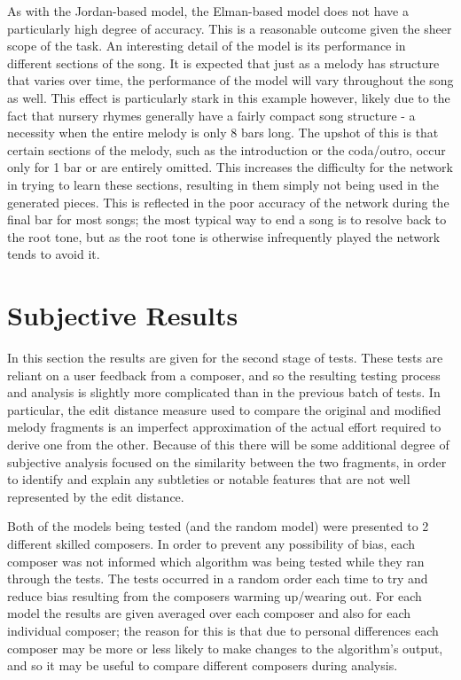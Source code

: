 \documentclass[ author={Stephen Livermore-Tozer},
				supervisor={Dr. Peter Flach},
				degree={MEng},
				title={Algorithmic Co-composition Using Machine Learning},
				subtitle={},
				type={research},
				year={2016} ]{dissertation}
\begin{document}
	
	As with the Jordan-based model, the Elman-based model does not have a particularly high degree of accuracy. This is a reasonable outcome given the sheer scope of the task. An interesting detail of the model is its performance in different sections of the song. It is expected that just as a melody has structure that varies over time, the performance of the model will vary throughout the song as well. This effect is particularly stark in this example however, likely due to the fact that nursery rhymes generally have a fairly compact song structure - a necessity when the entire melody is only 8 bars long. The upshot of this is that certain sections of the melody, such as the introduction or the coda/outro, occur only for 1 bar or are entirely omitted. This increases the difficulty for the network in trying to learn these sections, resulting in them simply not being used in the generated pieces. This is reflected in the poor accuracy of the network during the final bar for most songs; the most typical way to end a song is to resolve back to the root tone, but as the root tone is otherwise infrequently played the network tends to avoid it. 
	
	\section{Subjective Results}
	
	In this section the results are given for the second stage of tests. These tests are reliant on a user feedback from a composer, and so the resulting testing process and analysis is slightly more complicated than in the previous batch of tests. In particular, the edit distance measure used to compare the original and modified melody fragments is an imperfect approximation of the actual effort required to derive one from the other. Because of this there will be some additional degree of subjective analysis focused on the similarity between the two fragments, in order to identify and explain any subtleties or notable features that are not well represented by the edit distance.
	
	Both of the models being tested (and the random model) were presented to 2 different skilled composers. In order to prevent any possibility of bias, each composer was not informed which algorithm was being tested while they ran through the tests. The tests occurred in a random order each time to try and reduce bias resulting from the composers warming up/wearing out. For each model the results are given averaged over each composer and also for each individual composer; the reason for this is that due to personal differences each composer may be more or less likely to make changes to the algorithm's output, and so it may be useful to compare different composers during analysis.
	
\end{document}
